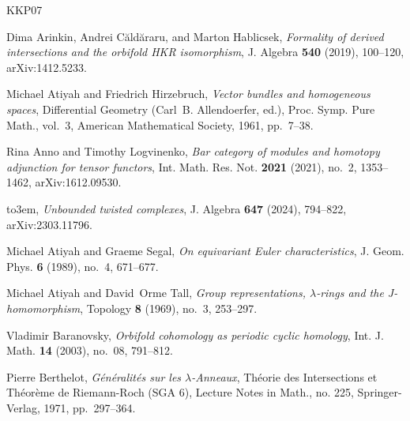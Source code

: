 \documentclass[12pt,a4paper,reqno]{amsart}
\begin{document}
\providecommand{\bysame}{\leavevmode\hbox to3em{\hrulefill}\thinspace}
\providecommand{\MR}{\relax\ifhmode\unskip\space\fi MR }
\providecommand{\MRhref}[2]{%
  \href{http://www.ams.org/mathscinet-getitem?mr=#1}{#2}
}
\providecommand{\href}[2]{#2}
\begin{thebibliography}{KKP07}

Dima Arinkin, Andrei C{\u a}ld{\u a}raru, and Marton Hablicsek, \emph{Formality
  of derived intersections and the orbifold {HKR} isomorphism}, J. Algebra
  \textbf{540} (2019), 100--120, arXiv:1412.5233.

Michael Atiyah and Friedrich Hirzebruch, \emph{Vector bundles and homogeneous
  spaces}, Differential {G}eometry (Carl~B. Allendoerfer, ed.), Proc. Symp.
  Pure Math., vol.~3, American Mathematical Society, 1961, pp.~7--38.

Rina Anno and Timothy Logvinenko, \emph{Bar category of modules and homotopy
  adjunction for tensor functors}, Int. Math. Res. Not. \textbf{2021} (2021),
  no.~2, 1353--1462, arXiv:1612.09530.

\bysame, \emph{Unbounded twisted complexes}, J. Algebra \textbf{647} (2024),
  794--822, arXiv:2303.11796.

Michael Atiyah and Graeme Segal, \emph{On equivariant {E}uler characteristics},
  J. Geom. Phys. \textbf{6} (1989), no.~4, 671--677.

Michael Atiyah and David~Orme Tall, \emph{Group representations,
  $\lambda$-rings and the {J}-homomorphism}, Topology \textbf{8} (1969), no.~3,
  253--297.

Vladimir Baranovsky, \emph{Orbifold cohomology as periodic cyclic homology},
  Int. J. Math. \textbf{14} (2003), no.~08, 791--812.

Pierre Berthelot, \emph{G{\'e}n{\'e}ralit{\'e}s sur les $\lambda$-{A}nneaux},
  Th{\'e}orie des {I}ntersections et {T}h{\'e}or{\`e}me de {R}iemann-{R}och
  (SGA 6), Lecture Notes in Math., no. 225, Springer-Verlag, 1971,
  pp.~297--364.


\end{thebibliography}
\end{document}
